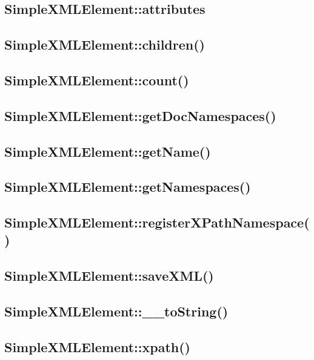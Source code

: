 \subsection{SimpleXMLElement::attributes}


\subsection{SimpleXMLElement::children()}


\subsection{SimpleXMLElement::count()}



\subsection{SimpleXMLElement::getDocNamespaces()}


\subsection{SimpleXMLElement::getName()}


\subsection{SimpleXMLElement::getNamespaces()}



\subsection{SimpleXMLElement::registerXPathNamespace()}



\subsection{SimpleXMLElement::saveXML()}


\subsection{SimpleXMLElement::\_\_toString()}


\subsection{SimpleXMLElement::xpath()}




